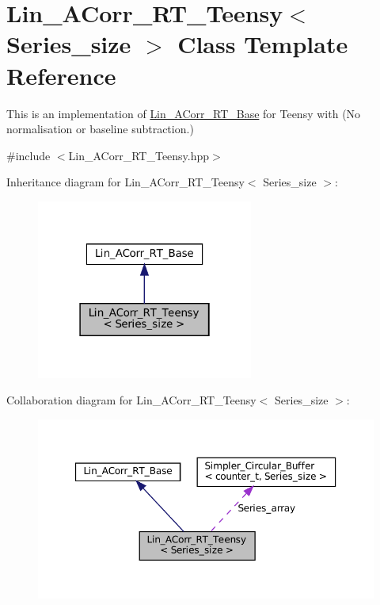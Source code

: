 \hypertarget{classLin__ACorr__RT__Teensy}{}\section{Lin\+\_\+\+A\+Corr\+\_\+\+R\+T\+\_\+\+Teensy$<$ Series\+\_\+size $>$ Class Template Reference}
\label{classLin__ACorr__RT__Teensy}


This is an implementation of \hyperlink{classLin__ACorr__RT__Base}{Lin\+\_\+\+A\+Corr\+\_\+\+R\+T\+\_\+\+Base} for Teensy with {\bfseries }(No normalisation or baseline subtraction.)  




{\ttfamily \#include $<$Lin\+\_\+\+A\+Corr\+\_\+\+R\+T\+\_\+\+Teensy.\+hpp$>$}



Inheritance diagram for Lin\+\_\+\+A\+Corr\+\_\+\+R\+T\+\_\+\+Teensy$<$ Series\+\_\+size $>$\+:\nopagebreak
\begin{figure}[H]
\begin{center}
\leavevmode
\includegraphics[width=202pt]{classLin__ACorr__RT__Teensy__inherit__graph}
\end{center}
\end{figure}


Collaboration diagram for Lin\+\_\+\+A\+Corr\+\_\+\+R\+T\+\_\+\+Teensy$<$ Series\+\_\+size $>$\+:\nopagebreak
\begin{figure}[H]
\begin{center}
\leavevmode
\includegraphics[width=350pt]{classLin__ACorr__RT__Teensy__coll__graph}
\end{center}
\end{figure}
